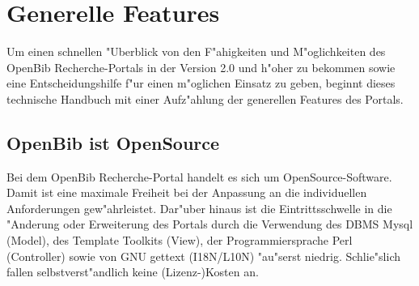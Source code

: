 \documentclass[11pt, twoside, a4paper, BCOR8mm, DIV12, bibtotoc,idxtotoc]{scrbook}
\begin{document}
\mainmatter


\chapter{Generelle Features}
Um einen schnellen "Uberblick von den F"ahigkeiten und M"oglichkeiten
des OpenBib Recherche-Portals in der Version 2.0 und h"oher zu
bekommen sowie eine Entscheidungshilfe f"ur einen m"oglichen Einsatz
zu geben, beginnt dieses technische Handbuch mit einer Aufz"ahlung der
generellen Features des Portals.

\section{OpenBib ist OpenSource}
Bei dem OpenBib Recherche-Portal handelt es sich um
OpenSource-Software. Damit ist eine maximale Freiheit bei der
Anpassung an die individuellen Anforderungen gew"ahrleistet.
Dar"uber hinaus ist die Eintrittsschwelle in die "Anderung oder
Erweiterung des Portals durch die Ver\-wen\-dung des DBMS Mysql (Model),
des Template Toolkits (View), der Programmiersprache Perl (Control\-ler)
sowie von GNU gettext (I18N/L10N) "au"serst niedrig. Schlie"slich
fallen selbst\-ver\-st"and\-lich keine (Lizenz-)Kosten an.
\end{document}
